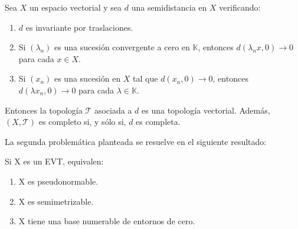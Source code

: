 
\begin{teorema}
Sea $X$ un espacio vectorial y sea $d$ una semidistancia en $X$ verificando: 
\begin{enumerate}
	\item $d$ es invariante por traslaciones.
	\item Si $(\lambda_{n})$ es una sucesión convergente a cero en $\mathds{K}$, entonces $d(\lambda_{n}x,0)\rightarrow 0$ para cada $x\in X$.
	\item Si $(x_{n})$ es una sucesión en $X$ tal que $d(x_{n},0)\rightarrow 0$, entonces $d(\lambda x_{n},0) \rightarrow 0$ para cada $\lambda\in\mathds{K}$.
\end{enumerate} 
Entonces la topología $\mathcal{T}$ asociada a $d$ es una topología vectorial. Además, $(X,\mathcal{T})$ es completo si, y sólo si, $d$ es completa. 
\end{teorema}


La segunda problemática planteada se resuelve en el siguiente resultado:

\begin{teorema}
Si X es un EVT, equivalen: 
\begin{enumerate}
  \item X es pseudonormable.
  \item X es semimetrizable.
  \item X tiene una base numerable de entornos de cero.
\end{enumerate}
\end{teorema}

